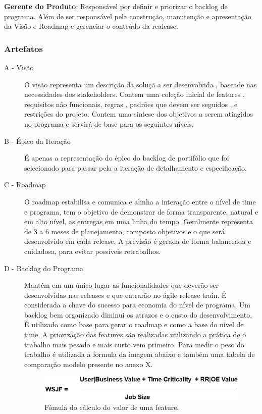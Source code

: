     \textbf{Gerente do Produto}: Responsável por definir e priorizar o backlog de programa.
    Além de ser responsável pela construção, manutenção e apresentação da Visão e Roadmap
    e gerenciar o conteúdo da realease.

  \subsubsection{Artefatos}

  \begin{description}
    \item[A - Visão]
    O visão representa um descrição da soluçã a ser desenvolvida , baseade nas necessidades
    dos stakeholders. Contem uma coleção inicial de features , requisitos não funcionais,
    regras , padrões que devem ser seguidos , e restrições do projeto. Contem uma sintese dos
    objetivos a serem atingidos no programa e servirá de base para os seguintes níveis.\cite{vision}
    \item[B - Épico da Iteração]
    É apenas a representação do épico do backlog de portifólio que foi selecionado
    para passar pela a iteração de detalhamento e especificação.
    \item[C - Roadmap]
    O roadmap estabilisa e comunica e alinha a interação entre o nível de time e programa,
    tem o objetivo de demonstrar de forma transparente, natural e em alto nível, as entregas
    em uma linha do tempo. Geralmente representa de 3 a 6 meses de planejamento, composto objetivos
    e o que será desenvolvido em cada release. A previsão é gerada de forma balanceada e cuidadosa,
    para evitar possíveis retrabalhos. \cite{roadmap}
    \item[D - Backlog do Programa]
    Mantém em um único lugar as funcionalidades que deverão ser desenvolvidas nas releases
    e que entrarão no ágile release train. É considerada a chave do sucesso para economia
    do nível de programa. Um backlog bem organizado diminui os atrazos e o custo do desenvolvimento.
    É utilizado como base para gerar o roadmap e como a base do nível de time\cite{programbacklog}.
    A priorização das features são realizadas utilizando a prática de o trabalho mais pesado e
    mais curto vem primeiro. Para medir o peso do trabalho é utilizada a formula da imagem abaixo  e também
    uma tabela de comparação modelo presente no anexo X\cite{wsjf}.

    \begin{figure}[H]
        \centering
      \includegraphics[keepaspectratio=true,scale=0.3]{figuras/WSJF-Formula.eps}
        \caption{Fómula do cálculo do valor de uma feature.}
        \label{fig:wsjf}
    \end{figure}


  \end{description}


